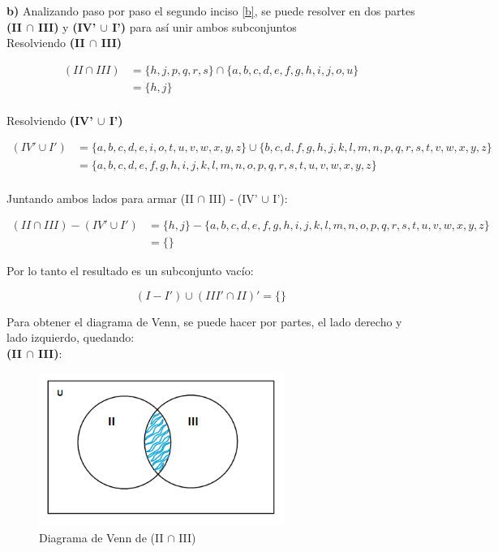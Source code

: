 \newpage

%
\textbf{b)} Analizando paso por paso el segundo inciso \ref{b}, se puede resolver en dos partes \textbf{(II $\cap$ III)} y \textbf{(IV' $\cup$ I')} para así unir ambos subconjuntos \\

Resolviendo \textbf{(II $\cap$ III)}

\begin{align*}
(II \cap III)  &= \{ h, j, p, q, r, s  \} \cap \{ a, b, c, d, e, f, g, h, i, j, o, u  \}  \\
  &=   \{ h, j  \}      \\
\end{align*}

Resolviendo \textbf{(IV' $\cup$ I')}

\begin{align*}
(IV' \cup I')  &=  \{ a, b, c, d, e, i, o, t, u, v, w, x, y, z \}  \cup \{ b, c, d, f, g, h, j, k, l, m, n, p, q, r, s, t, v, w, x, y, z \}  \\
  &=  \{ a, b, c, d, e, f, g, h, i, j, k, l, m, n, o, p, q, r, s, t, u, v, w, x, y, z \} \\
\end{align*}

Juntando ambos lados para armar (II $\cap$ III) - (IV' $\cup$ I'):

\begin{align*}
(II \cap III) - (IV' \cup I') &= \{ h, j  \} - \{ a, b, c, d, e, f, g, h, i, j, k, l, m, n, o, p, q, r, s, t, u, v, w, x, y, z \} \\
  &= \{ \} 
\end{align*}

Por lo tanto el resultado es un subconjunto vacío:

\begin{equation*}
    \boxed{(I - I') \cup (III' \cap II)' = \{  \} }
\end{equation*}





Para obtener el diagrama de Venn, se puede hacer por partes, el lado derecho y lado izquierdo, quedando: \\

\textbf{(II $\cap$ III)}: 

\begin{figure}[htbp]
\centering
\includegraphics[width=8cm]{b/aa.png}
\caption[]{Diagrama de Venn de (II $\cap$ III)}
\end{figure} 

